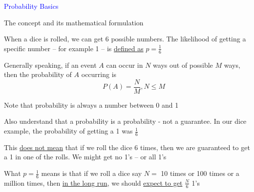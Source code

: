 \documentclass[14pt,fleqn]{extarticle}
\begin{document}
 
\begin{skill}
\begin{narrow}
\textcolor{blue}{Probability Basics}

The concept and its mathematical formulation 
\end{narrow}

\reason 

When a dice is rolled, we can get 6 possible numbers. The likelihood of getting a specific number -- for example 1 -- is \underline{defined as} $p = \frac{1}{6}$ \newline 

Generally speaking, if an event $A$ can occur in $N$ ways out of possible $M$ ways, then the probability of $A$ occurring is \[\qquad P(A) = \dfrac{N}{M}, N\leq M\]

Note that probability is always a number between 0 and 1\newline 

Also understand that a probability is a probability - not a guarantee. In our dice example, the probability of getting a 1 was $\frac{1}{6}$ \newline 

This \underline{does not mean} that if we roll the dice 6 times, then we are 
guaranteed to get a 1 in one of the rolls. We might get no 1's -- or all 1's\newline 

What $p= \frac{1}{6}$ means is that if we roll a dice say $N =$ 10 times or 100 times or a million times, then \underline{in the long run}, we should \underline{expect to get} $\frac{N}{6}$ 1's


\end{skill} 
\end{document}
